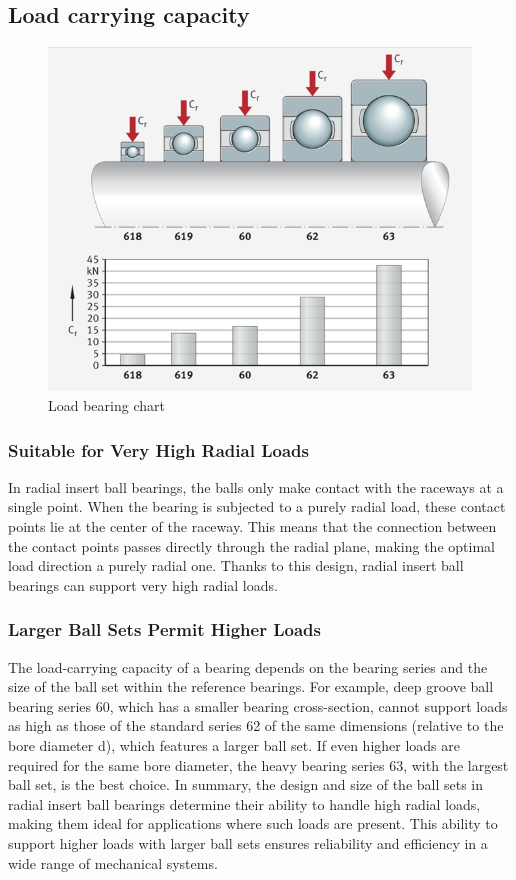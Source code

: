\documentclass[../../main]{subfiles}
\begin{document}
\subsection{Load carrying capacity}
\begin{figure}[h!]
  \centering
  \includegraphics[width=\textwidth]{img/Picture5.png}
  \caption{Load bearing chart}
  \end{figure}

\subsubsection{Suitable for Very High Radial Loads}
In radial insert ball bearings, the balls only make contact with the raceways at a single point. When the bearing is subjected to a purely radial load, these contact points lie at the center of the raceway. This means that the connection between the contact points passes directly through the radial plane, making the optimal load direction a purely radial one. Thanks to this design, radial insert ball bearings can support very high radial loads.

\subsubsection{Larger Ball Sets Permit Higher Loads}

The load-carrying capacity of a bearing depends on the bearing series and the size of the ball set within the reference bearings. For example, deep groove ball bearing series 60, which has a smaller bearing cross-section, cannot support loads as high as those of the standard series 62 of the same dimensions (relative to the bore diameter d), which features a larger ball set. If even higher loads are required for the same bore diameter, the heavy bearing series 63, with the largest ball set, is the best choice.
In summary, the design and size of the ball sets in radial insert ball bearings determine their ability to handle high radial loads, making them ideal for applications where such loads are present. This ability to support higher loads with larger ball sets ensures reliability and efficiency in a wide range of mechanical systems.
\end{document}
